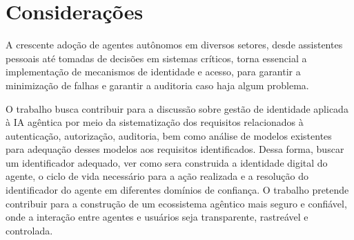\documentclass[11pt]{../../modelos-latex/classes/ifscarticle}
\begin{document}
\section{Considerações}

A crescente adoção de agentes autônomos em diversos setores, desde assistentes pessoais até tomadas de decisões em sistemas críticos, torna essencial a implementação de mecanismos de identidade e acesso, para garantir a minimização de falhas e garantir a auditoria caso haja algum problema. 

O trabalho busca contribuir para a discussão sobre gestão de identidade aplicada à IA agêntica por meio da sistematização dos requisitos relacionados à autenticação, autorização, auditoria, bem como análise de modelos existentes para adequação desses modelos aos requisitos identificados. Dessa forma, buscar um identificador adequado, ver como sera construida a identidade digital do agente, o ciclo de vida necessário para a ação realizada e a resolução do identificador do agente em diferentes domínios de confiança. O trabalho pretende contribuir para a construção de um ecossistema agêntico mais seguro e confiável, onde a interação entre agentes e usuários seja transparente, rastreável e controlada.


\printbibliography[heading=bibintoc,title={Referências}]
\end{document}
